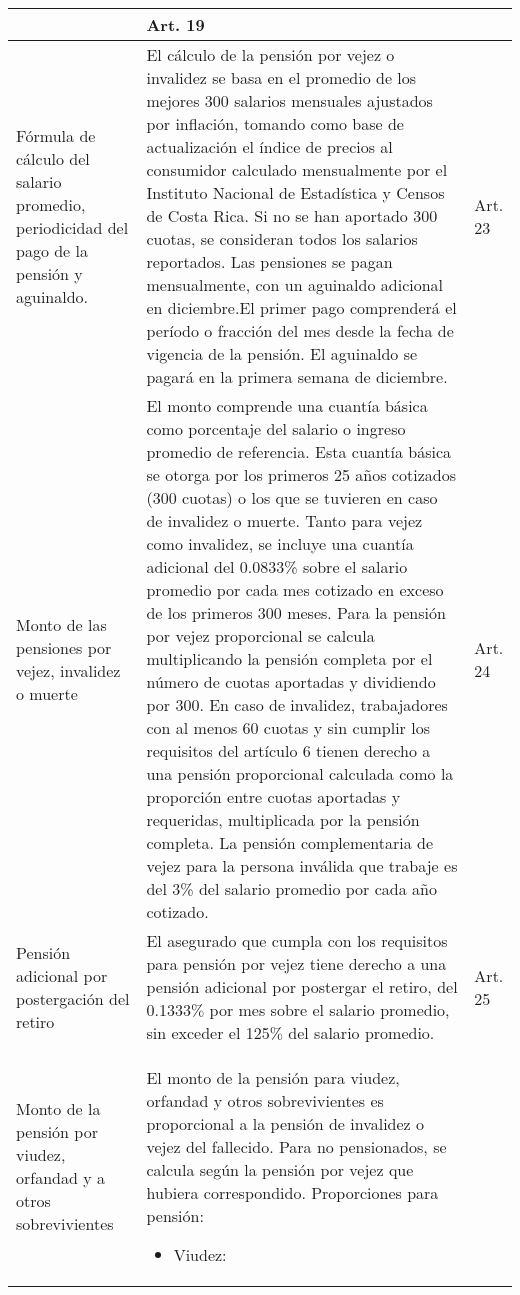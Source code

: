 \documentclass[
]{article}
\begin{document}
\begin{longtable}{|m{4cm}|m{10cm}|m{1.3cm}|}
\begin{enumerate}
\end{enumerate} & Art. 19 \\
\hline
Fórmula de cálculo del salario promedio, periodicidad del pago de la pensión y aguinaldo. & El cálculo de la pensión por vejez o invalidez se basa en el promedio de los mejores 300 salarios mensuales ajustados por inflación, tomando como base de actualización el índice de precios al consumidor calculado mensualmente por el Instituto Nacional de Estadística y Censos de Costa Rica. Si no se han aportado 300 cuotas, se consideran todos los salarios reportados. Las pensiones se pagan mensualmente, con un aguinaldo adicional en diciembre.El primer pago comprenderá el período o fracción del mes desde la fecha de vigencia de la pensión. El aguinaldo se pagará en la primera semana de diciembre. & Art. 23 \\
\hline
Monto de las pensiones por vejez, invalidez o muerte & El monto comprende una cuantía básica como porcentaje del salario o ingreso promedio de referencia. Esta cuantía básica se otorga por los primeros 25 años cotizados (300 cuotas) o los que se tuvieren en caso de invalidez o muerte. Tanto para vejez como invalidez, se incluye una cuantía adicional del 0.0833\% sobre el salario promedio por cada mes cotizado en exceso de los primeros 300 meses. Para la pensión por vejez proporcional se calcula multiplicando la pensión completa por el número de cuotas aportadas y dividiendo por 300. En caso de invalidez, trabajadores con al menos 60 cuotas y sin cumplir los requisitos del artículo 6 tienen derecho a una pensión proporcional calculada como la proporción entre cuotas aportadas y requeridas, multiplicada por la pensión completa. La pensión complementaria de vejez para la persona inválida que trabaje es del 3\% del salario promedio por cada año cotizado.& Art. 24 \\
\hline
Pensión adicional por postergación del retiro & El asegurado que cumpla con los requisitos para pensión por vejez tiene derecho a una pensión adicional por postergar el retiro, del 0.1333$\%$ por mes sobre el salario promedio, sin exceder el 125$\%$ del salario promedio. & Art. 25 \\
\hline
Monto de la pensión por viudez, orfandad y a otros sobrevivientes & El monto de la pensión para viudez, orfandad y otros sobrevivientes es proporcional a la pensión de invalidez o vejez del fallecido. Para no pensionados, se calcula según la pensión por vejez que hubiera correspondido.
Proporciones para pensión:
\begin{itemize}
    \item Viudez:

\end{itemize}
\end{longtable}
\end{document}
